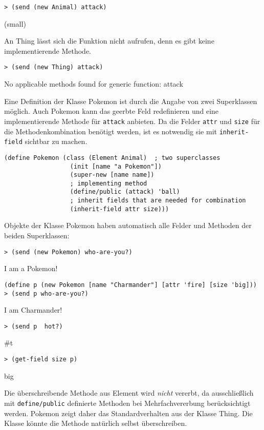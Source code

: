 \begin{lstlisting}
> (send (new Animal) attack)
\end{lstlisting}
{\rsymbol (small)}

An Thing lässt sich die Funktion nicht aufrufen, denn es gibt keine implementierende Methode.

\begin{lstlisting}
> (send (new Thing) attack)
\end{lstlisting}
{\rerror No applicable methods found for generic function: attack}

Eine Definition der Klasse Pokemon ist durch die Angabe von zwei Superklassen möglich. Auch Pokemon kann das geerbte Feld redefinieren und eine implementierende Methode für \texttt{attack} anbieten. Da die Felder \texttt{attr} und \texttt{size} für die Methodenkombination benötigt werden, ist es notwendig sie mit \texttt{inherit-field} sichtbar zu machen.

\begin{lstlisting}
(define Pokemon (class (Element Animal)  ; two superclasses
                  (init [name "a Pokemon"])
                  (super-new [name name])
                  ; implementing method
                  (define/public (attack) 'ball)
                  ; inherit fields that are needed for combination
                  (inherit-field attr size)))
\end{lstlisting}

Objekte der Klasse Pokemon haben automatisch alle Felder und Methoden der beiden Superklassen:

\begin{lstlisting}
> (send (new Pokemon) who-are-you?)
\end{lstlisting}
{\routput {\qq}I am a Pokemon!\qq}

\begin{lstlisting}
(define p (new Pokemon [name "Charmander"] [attr 'fire] [size 'big]))
> (send p who-are-you?)
\end{lstlisting}
{\routput {\qq}I am Charmander!\qq}

\begin{lstlisting}
> (send p  hot?)
\end{lstlisting}
{\routput \#t}

\begin{lstlisting}
> (get-field size p)
\end{lstlisting}
{\rsymbol big}

Die überschreibende Methode aus Element wird \emph{nicht} vererbt, da ausschließlich mit \texttt{define/public} definierte Methoden bei Mehrfachvererbung berücksichtigt werden. Pokemon zeigt daher das Standardverhalten aus der Klasse Thing. Die Klasse könnte die Methode natürlich selbst überschreiben.

